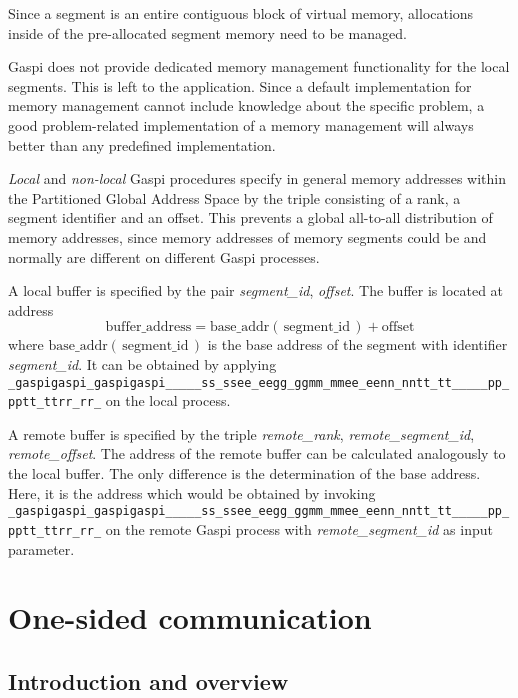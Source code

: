\documentclass[a4paper]{article}
\makeatletter
\newlength{\lw}\setlength{\lw}{0.4pt}
\newlength{\st}\setlength{\st}{0pt}
\newcommand{\zerowsep}{\hskip 0pt plus 0.1pt minus 0.1pt}
\newcommand{\ZSEP}[1]{\ifx#1\@@@EOZ@@@\let\next\relax\else\ifx#1\_#1\zerowsep\else#1\fi\let\next\ZSEP\fi\next}
\newcommand{\zsep}[1]{\ZSEP{}#1\@@@EOZ@@@}
\newcommand{\gaspiprefix}{gaspi}
\newcommand{\GASPI}{{\sc Gaspi}}
\newcommand{\function}[1]{{\tt #1}}
\newcommand{\parameter}[1]{{\it #1}}
\newcommand{\gaspifunction}[1]{\function{\protect\zsep{\gaspiprefix\_#1}}}
\newcommand{\gaspisemantic}[1]{{\emph{#1}}}
\makeatother
\begin{document}
Since a segment is an entire contiguous block of virtual memory,
allocations inside of the pre-allocated segment memory need to be
managed.

\GASPI{} does not provide dedicated memory management functionality
for the local segments. This is left to the application.
Since a default implementation for memory management cannot include knowledge about the specific problem, a 
good problem-related implementation of a memory management will always better
than any predefined implementation.

\gaspisemantic{Local} and \gaspisemantic{non-local} \GASPI{} procedures
specify in general memory addresses within the Partitioned Global Address Space by
the triple consisting of a rank, a segment identifier and
an offset.  This prevents a global all-to-all distribution of memory
addresses, since memory addresses of memory segments could be and
normally are different on different \GASPI{} processes.

A local buffer is specified by the pair \parameter{segment\_id}, \parameter{offset}.
The buffer  is located at address
\begin{equation}
\mbox{buffer\_address} = \mbox{base\_addr}\left(\, \mbox{segment\_id} \,\right) + \mbox{offset} \nonumber
\end{equation}
where $\mbox{base\_addr}(\, \mbox{segment\_id} \,)$ is the base address of the segment with identifier
\parameter{segment\_id}.
It can be obtained by applying \gaspifunction{segment\_ptr} on the local process.

A remote buffer is specified by the triple \parameter{remote\_rank}, \parameter{remote\_segment\_id},
\parameter{remote\_offset}.
The address of the remote  buffer can be calculated analogously to the local buffer. The only
difference is the determination of the base address. Here, it is the address
which would be obtained by invoking \gaspifunction{segment\_ptr}
on the remote \GASPI{} process with \parameter{remote\_segment\_id} as input parameter.

\section{One-sided communication}

\subsection{Introduction and overview}
\end{document}
